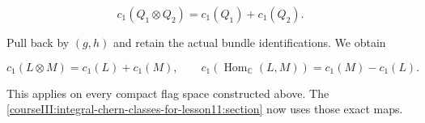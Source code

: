 \[
c_1(Q_1\otimes Q_2)=c_1(Q_1)+c_1(Q_2).
\]

Pull back by \((g,h)\) and retain the actual bundle identifications. We obtain

\begin{equation}
c_1(L\otimes M)=c_1(L)+c_1(M),\qquad
c_1(\operatorname{Hom}_{\mathbb C}(L,M))=c_1(M)-c_1(L).
\label{courseIII:projective-splitting-for-lesson11:eq:5.1}
\end{equation}

This applies on every compact flag space constructed above. The \cref{courseIII:integral-chern-classes-for-lesson11:section} now uses those exact maps.
